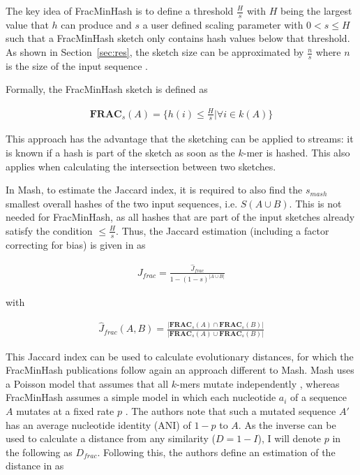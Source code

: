 The key idea of FracMinHash is to define a threshold $\frac{H}{s}$ with $H$
being the largest value that $h$ can produce and $s$ a user defined scaling
parameter with $0 < s \leq H$ such that a FracMinHash sketch only contains hash
values below that threshold. As shown in Section~\ref{sec:res}, the sketch size can be
approximated by $\frac{n}{s}$ where $n$ is the size of the input sequence
\cite{irberLightweightCompositionalAnalysis2022,heraDebiasingFracMinHashDeriving2023}.


Formally, the FracMinHash sketch is defined as 

\begin{align}
  \mathbf{FRAC}_s(A) = \{h(i) \leq \frac{H}{s} | \forall i \in k(A)\}
\end{align}

This approach has the advantage that the sketching can be applied to streams: it
is known if a hash is part of the sketch as soon as the $k$-mer is hashed. This
also applies when calculating the intersection between two sketches. 

In Mash, to estimate the Jaccard index, it is required to also find the
$s_{mash}$ smallest overall hashes of the two input sequences, i.e. $S(A \cup
B)$. This is not needed for FracMinHash, as all hashes that are part of the
input sketches already satisfy the condition $\leq \frac{H}{s}$. Thus, the
Jaccard estimation (including a factor correcting for bias) is given in
\cite{heraDebiasingFracMinHashDeriving2023} as

\begin{align}
  J_{frac} = \frac{\hat{J}_{frac}}{1 - (1 - s)^{|A \cup B|}}
\end{align}

with

\begin{align}
  \hat{J}_{frac}(A, B) = \frac{|\mathbf{FRAC}_s(A) \cap \mathbf{FRAC}_s(B)|}{|\mathbf{FRAC}_s(A) \cup \mathbf{FRAC}_s(B)|}  
\end{align}

This Jaccard index can be used to calculate evolutionary distances, for which
the FracMinHash publications follow again an approach different to Mash. Mash
uses a Poisson model that assumes that all $k$-mers mutate independently
\cite{ondovMashFastGenome2016,heraDebiasingFracMinHashDeriving2023,fanAssemblyAlignmentfreeMethod2015},
whereas FracMinHash assumes a simple model in which each nucleotide $a_i$ of a
sequence $A$ mutates at a fixed rate $p$
\cite{heraDebiasingFracMinHashDeriving2023}. The authors note that such a
mutated sequence $A'$ has an average nucleotide identity (ANI) of $1-p$ to $A$.
As the inverse can be used to calculate a distance from any similarity ($D = 1 -
I$), I will denote $p$ in the following as $D_{frac}$. Following this, the
authors define an estimation of the distance in
\cite{heraDebiasingFracMinHashDeriving2023} as

